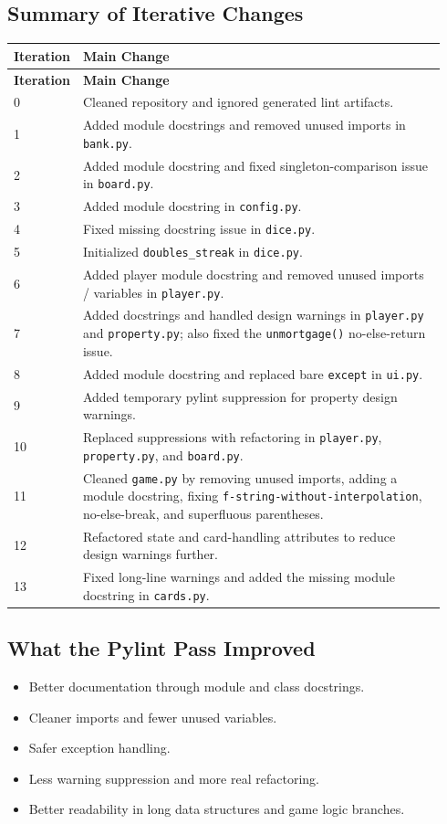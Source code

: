 \documentclass[12pt]{article}
\begin{document}
\subsection{Summary of Iterative Changes}
\small
\begin{longtable}{p{0.10\linewidth}p{0.84\linewidth}}
\toprule
\textbf{Iteration} & \textbf{Main Change} \\
\midrule
\endfirsthead
\toprule
\textbf{Iteration} & \textbf{Main Change} \\
\midrule
\endhead
0 & Cleaned repository and ignored generated lint artifacts. \\
1 & Added module docstrings and removed unused imports in \texttt{bank.py}. \\
2 & Added module docstring and fixed singleton-comparison issue in \texttt{board.py}. \\
3 & Added module docstring in \texttt{config.py}. \\
4 & Fixed missing docstring issue in \texttt{dice.py}. \\
5 & Initialized \texttt{doubles\_streak} in \texttt{dice.py}. \\
6 & Added player module docstring and removed unused imports / variables in \texttt{player.py}. \\
7 & Added docstrings and handled design warnings in \texttt{player.py} and \texttt{property.py}; also fixed the \texttt{unmortgage()} no-else-return issue. \\
8 & Added module docstring and replaced bare \texttt{except} in \texttt{ui.py}. \\
9 & Added temporary pylint suppression for property design warnings. \\
10 & Replaced suppressions with refactoring in \texttt{player.py}, \texttt{property.py}, and \texttt{board.py}. \\
11 & Cleaned \texttt{game.py} by removing unused imports, adding a module docstring, fixing \texttt{f-string-without-interpolation}, no-else-break, and superfluous parentheses. \\
12 & Refactored state and card-handling attributes to reduce design warnings further. \\
13 & Fixed long-line warnings and added the missing module docstring in \texttt{cards.py}. \\
\bottomrule
\end{longtable}
\normalsize

\subsection{What the Pylint Pass Improved}
\begin{itemize}
\item Better documentation through module and class docstrings.
\item Cleaner imports and fewer unused variables.
\item Safer exception handling.
\item Less warning suppression and more real refactoring.
\item Better readability in long data structures and game logic branches.
\end{itemize}
\end{document}
